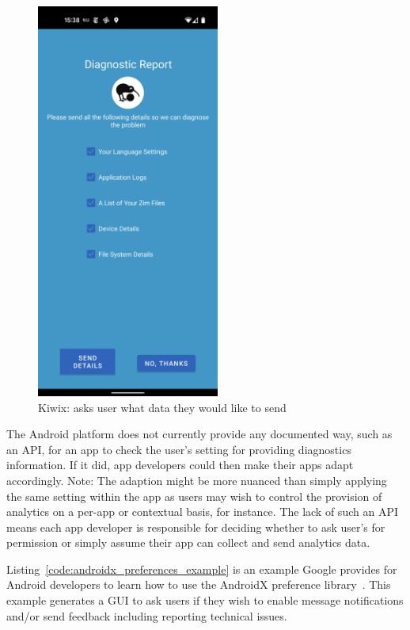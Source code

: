 \begin{figure}
    \centering
    \includegraphics[width=6cm]{images/kiwix/Screenshot-Diagnostic-Report-30-Jun-2022.png}
    \caption{Kiwix: asks user what data they would like to send}
    \label{fig:kiwix-diagnostic-report-ui}
\end{figure}

The Android platform does not currently provide any documented way, such as an API, for an app to check the user's setting for providing diagnostics information. If it did, app developers could then make their apps adapt accordingly. Note: The adaption might be more nuanced than simply applying the same setting within the app as users may wish to control the provision of analytics on a per-app or contextual basis, for instance.
The lack of such an API means each app developer is responsible for deciding whether to ask user's for permission or simply assume their app can collect and send analytics data.

Listing~\ref{code:androidx_preferences_example} is an example Google provides for Android developers to learn how to use the AndroidX preference library~. This example generates a GUI to ask users if they wish to enable message notifications and/or send feedback including reporting technical issues. 


